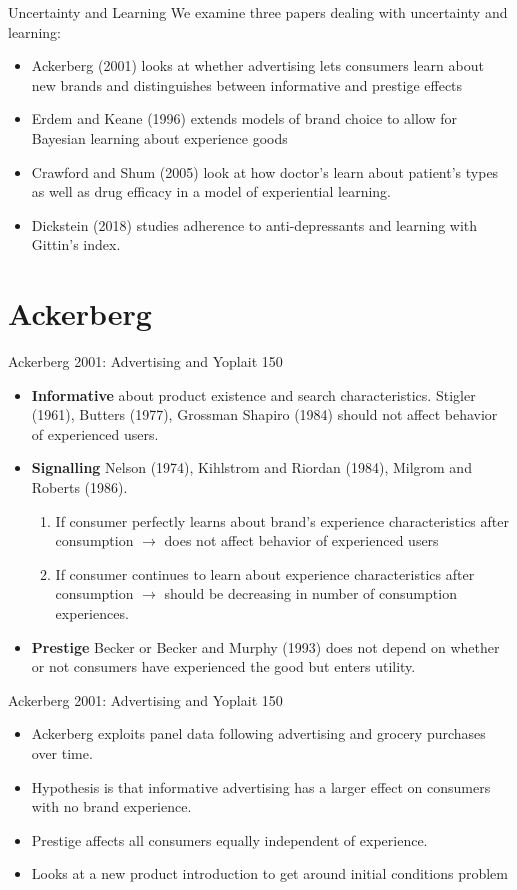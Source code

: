 \documentclass[xcolor=pdftex,dvipsnames,table,mathserif,aspectratio=169]{beamer}
\begin{document}
 
\begin{frame}{Uncertainty and Learning}
We examine three papers dealing with uncertainty and learning:
\begin{itemize}
\item Ackerberg (2001) looks at whether advertising lets consumers learn about new brands and distinguishes between informative and prestige effects
\item Erdem and Keane (1996) extends models of brand choice to allow for Bayesian learning about experience goods
\item Crawford and Shum (2005) look at how doctor's learn about patient's types as well as drug efficacy in a model of experiential learning.
\item Dickstein (2018) studies adherence to anti-depressants and learning with Gittin's index.
\end{itemize}
\end{frame}

\section*{Ackerberg}
\begin{frame}{Ackerberg 2001: Advertising and Yoplait 150}
\begin{itemize}
\item \textbf{Informative} about product existence and search characteristics. Stigler (1961), Butters (1977), Grossman Shapiro (1984) should not affect behavior of experienced users.
\item \textbf{Signalling} Nelson (1974), Kihlstrom and Riordan (1984), Milgrom and Roberts (1986).
\begin{enumerate}
\item If consumer perfectly learns about brand's experience characteristics after consumption $\rightarrow$ does not affect behavior of experienced users
\item If consumer continues to learn about  experience characteristics after consumption $\rightarrow$ should be decreasing in number of consumption experiences.
\end{enumerate}
\item \textbf{Prestige} Becker or Becker and Murphy (1993) does not depend on whether or not consumers have experienced the good but enters utility.
\end{itemize}
\end{frame}

\begin{frame}{Ackerberg 2001: Advertising and Yoplait 150}
\begin{itemize}
\item Ackerberg exploits panel data following advertising and grocery purchases over time.
\item Hypothesis is that \alert{informative} advertising has a larger effect on consumers with no brand experience.
\item \alert{Prestige} affects all consumers equally independent of experience.
\item Looks at a new product introduction to get around \alert{initial conditions problem}
\end{itemize}
\end{frame}
\end{document}
